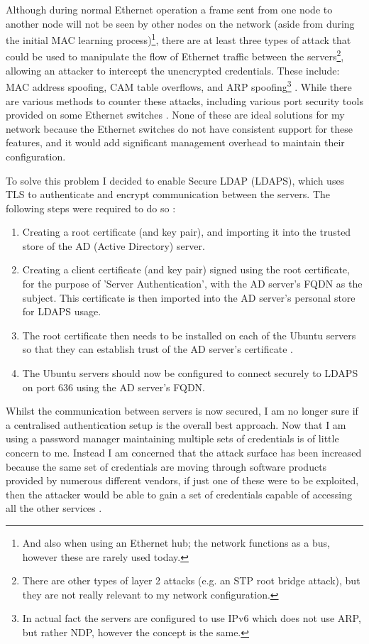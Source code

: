 \documentclass[11pt,a4paper]{scrartcl}
\begin{document}
\begin{refsection}
Although during normal Ethernet operation a frame sent from one node to another node will not be seen by other nodes on the network (aside from during the initial MAC learning process)\footnote{And also when using an Ethernet hub; the network functions as a bus, however these are rarely used today.}, there are at least three types of attack that could be used to manipulate the flow of Ethernet traffic between the servers\footnote{There are other types of layer 2 attacks (e.g. an STP root bridge attack), but they are not really relevant to my network configuration.}, allowing an attacker to intercept the unencrypted credentials.
These include: MAC address spoofing, CAM table overflows, and ARP spoofing\footnote{In actual fact the servers are configured to use IPv6 which does not use ARP, but rather NDP, however the concept is the same.} \cite{l2attacks}.
While there are various methods to counter these attacks, including various port security tools provided on some Ethernet switches \cite[193]{odom_icnd1}.
None of these are ideal solutions for my network because the Ethernet switches do not have consistent support for these features, and it would add significant management overhead to maintain their configuration.

To solve this problem I decided to enable Secure LDAP (LDAPS), which uses TLS to authenticate and encrypt communication between the servers. The following steps were required to do so \cite{microsoft_enable_ldaps, ad_ldaps_gist}:
\begin{enumerate}
	\item Creating a root certificate (and key pair), and importing it into the trusted store of the AD (Active Directory) server.
	\item Creating a client certificate (and key pair) signed using the root certificate, for the purpose of 'Server Authentication', with the AD server's FQDN as the subject. This certificate is then imported into the AD server's personal store for LDAPS usage.
	\item The root certificate then needs to be installed on each of the Ubuntu servers so that they can establish trust of the AD server's certificate \cite{ubuntu_ca_cert}.
	\item The Ubuntu servers should now be configured to connect securely to LDAPS on port 636 using the AD server's FQDN.
\end{enumerate}

Whilst the communication between servers is now secured, I am no longer sure if a centralised authentication setup is the overall best approach. Now that I am using a password manager maintaining multiple sets of credentials is of little concern to me. Instead I am concerned that the attack surface has been increased because the same set of credentials are moving through software products provided by numerous different vendors, if just one of these were to be exploited, then the attacker would be able to gain a set of credentials capable of accessing all the other services \cite{huque_ldap,newington_ldap}.

\printbibliography

\end{refsection}
\end{document}
